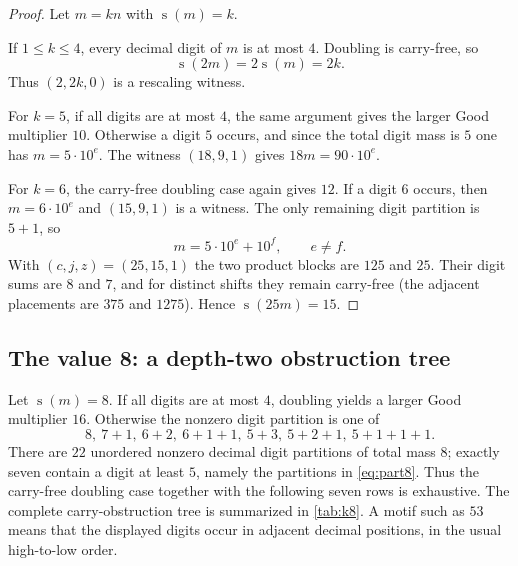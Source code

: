 \documentclass[11pt]{article}
\newcommand{\ds}{\operatorname{s}}
\begin{document}
\begin{proof}
Let $m=kn$ with $\ds(m)=k$.

If $1\le k\le4$, every decimal digit of $m$ is at most $4$.  Doubling is carry-free, so
\[
 \ds(2m)=2\ds(m)=2k.
\]
Thus $(2,2k,0)$ is a rescaling witness.

For $k=5$, if all digits are at most $4$, the same argument gives the larger Good multiplier $10$.  Otherwise a digit $5$ occurs, and since the total digit mass is $5$ one has $m=5\cdot10^e$.  The witness $(18,9,1)$ gives $18m=90\cdot10^e$.

For $k=6$, the carry-free doubling case again gives $12$.  If a digit $6$ occurs, then $m=6\cdot10^e$ and $(15,9,1)$ is a witness.  The only remaining digit partition is $5+1$, so
\[
 m=5\cdot10^e+10^f,\qquad e\ne f.
\]
With $(c,j,z)=(25,15,1)$ the two product blocks are $125$ and $25$.  Their digit sums are $8$ and $7$, and for distinct shifts they remain carry-free (the adjacent placements are $375$ and $1275$).  Hence $\ds(25m)=15$.
\end{proof}

\subsection{The value 8: a depth-two obstruction tree}
Let $\ds(m)=8$.  If all digits are at most $4$, doubling yields a larger Good multiplier $16$.  Otherwise the nonzero digit partition is one of
\begin{equation}\label{eq:part8}
  8,
  \ 7+1,
  \ 6+2,
  \ 6+1+1,
  \ 5+3,
  \ 5+2+1,
  \ 5+1+1+1.
\end{equation}
There are $22$ unordered nonzero decimal digit partitions of total mass $8$; exactly seven contain a digit at least $5$, namely the partitions in \eqref{eq:part8}.  Thus the carry-free doubling case together with the following seven rows is exhaustive.  The complete carry-obstruction tree is summarized in \cref{tab:k8}.  A motif such as $53$ means that the displayed digits occur in adjacent decimal positions, in the usual high-to-low order.
\end{document}
